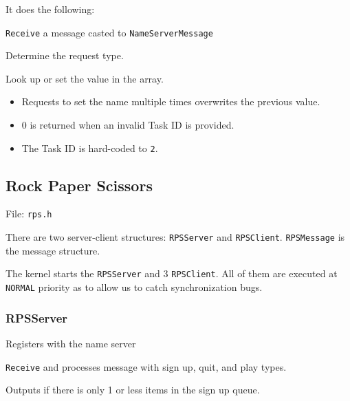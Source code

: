 \documentclass[letterpaper, 11pt]{article}
\begin{document}
It does the following:
\begin{list}{.}
{
\setlength{\rightmargin}{\leftmargin}
}

\item \texttt{Receive} a message casted to \texttt{NameServerMessage}

\item Determine the request type.

\item Look up or set the value in the array.
\end{list}
%
\begin{itemize}

\item Requests to set the name multiple times overwrites the previous value.

\item 0 is returned when an invalid Task ID is provided.

\item The Task ID is hard-coded to \texttt{2}.

\end{itemize}


\subsection{Rock Paper Scissors%
  \label{rock-paper-scissors}%
}

File: \texttt{rps.h}

There are two server-client structures: \texttt{RPSServer} and \texttt{RPSClient}. \texttt{RPSMessage} is the message structure.

The kernel starts the \texttt{RPSServer} and 3 \texttt{RPSClient}. All of them are executed at \texttt{NORMAL} priority as to allow us to catch synchronization bugs.


\subsubsection{RPSServer%
  \label{rpsserver}%
}
\setcounter{listcnt0}{0}
\begin{list}{.}
{
\setlength{\rightmargin}{\leftmargin}
}

\item Registers with the name server

\item \texttt{Receive} and processes message with sign up, quit, and play types.

\item Outputs if there is only 1 or less items in the sign up queue.
\end{list}
\end{document}

